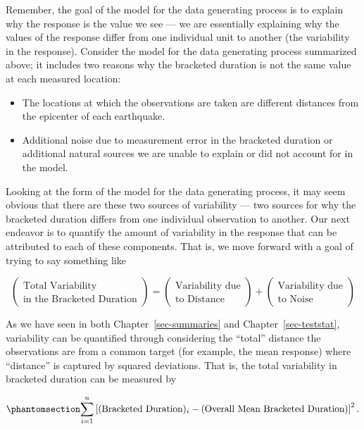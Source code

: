 \documentclass[
  letterpaper,
  DIV=11,
  numbers=noendperiod]{scrreprt}
\providecommand{\tightlist}{%
  \setlength{\itemsep}{0pt}\setlength{\parskip}{0pt}}\usepackage{longtable,booktabs,array}
\theoremstyle{definition}
\theoremstyle{definition}
\theoremstyle{plain}
\theoremstyle{remark}
\begin{document}
Remember, the goal of the model for the data generating process is to
explain why the response is the value we see --- we are essentially
explaining why the values of the response differ from one individual
unit to another (the variability in the response). Consider the model
for the data generating process summarized above; it includes two
reasons why the bracketed duration is not the same value at each
measured location:

\begin{itemize}
\tightlist
\item
  The locations at which the observations are taken are different
  distances from the epicenter of each earthquake.
\item
  Additional noise due to measurement error in the bracketed duration or
  additional natural sources we are unable to explain or did not account
  for in the model.
\end{itemize}

Looking at the form of the model for the data generating process, it may
seem obvious that there are these two sources of variability --- two
sources for why the bracketed duration differs from one individual
observation to another. Our next endeavor is to quantify the amount of
variability in the response that can be attributed to each of these
components. That is, we move forward with a goal of trying to say
something like

\[\begin{pmatrix} \text{Total Variability} \\ \text{in the Bracketed Duration} \end{pmatrix} = \begin{pmatrix} \text{Variability due} \\ \text{to Distance} \end{pmatrix} + \begin{pmatrix} \text{Variability due} \\ \text{to Noise} \end{pmatrix}\]

As we have seen in both Chapter~\ref{sec-summaries} and
Chapter~\ref{sec-teststat}, variability can be quantified through
considering the ``total'' distance the observations are from a common
target (for example, the mean response) where ``distance'' is captured
by squared deviations. That is, the total variability in bracketed
duration can be measured by

\begin{equation}\phantomsection\label{eq-regquality-sst}{\sum_{i=1}^{n} \left[(\text{Bracketed Duration})_i - (\text{Overall Mean Bracketed Duration})\right]^2.}\end{equation}
\end{document}
